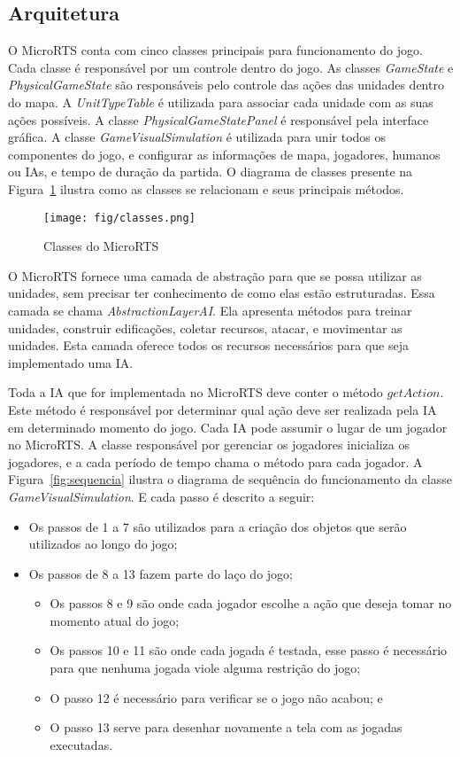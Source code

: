 \subsection{Arquitetura}

O MicroRTS conta com cinco classes principais para funcionamento do jogo. 
Cada classe é responsável por um controle dentro do jogo.
As classes \textit{GameState} e \textit{PhysicalGameState} são responsáveis pelo controle das ações das unidades dentro do mapa.
A \textit{UnitTypeTable} é utilizada para associar cada unidade com as suas ações possíveis.
A classe \textit{PhysicalGameStatePanel} é responsável pela interface gráfica.
A classe \textit{GameVisualSimulation} é utilizada para unir todos os componentes do jogo, e configurar as informações de mapa, jogadores, humanos ou IAs, e tempo de duração da partida.
O diagrama de classes presente na Figura~\ref{fig:classes} ilustra como as classes se relacionam e seus principais métodos.

\begin{figure}[ht]
	\centering
	\texttt{[image: fig/classes.png]}
	\caption{Classes do MicroRTS}
	\label{fig:classes}
\end{figure} 

O MicroRTS fornece uma camada de abstração para que se possa utilizar as unidades, sem precisar ter conhecimento de como elas estão estruturadas. 
Essa camada se chama \textit{AbstractionLayerAI}. 
Ela apresenta métodos para treinar unidades, construir edificações, coletar recursos, atacar, e movimentar as unidades. 
Esta camada oferece todos os recursos necessários para que seja implementado uma IA.

Toda a IA que for implementada no MicroRTS deve conter o método $getAction$.
Este método é responsável por determinar qual ação deve ser realizada pela IA em determinado momento do jogo.
Cada IA pode assumir o lugar de um jogador no MicroRTS. 
A classe responsável por gerenciar os jogadores inicializa os jogadores, e a cada período de tempo chama o método para cada jogador.
A Figura~\ref{fig:sequencia} ilustra o diagrama de sequência do funcionamento da classe \textit{GameVisualSimulation}. E cada passo é descrito a seguir:

\begin{itemize}
	\item Os passos de 1 a 7 são utilizados para a criação dos objetos que serão utilizados ao longo do jogo;
	\item Os passos de 8 a 13 fazem parte do laço do jogo;
	\begin{itemize}
		\item Os passos 8 e 9 são onde cada jogador escolhe a ação que deseja tomar no momento atual do jogo;
		\item Os passos 10 e 11 são onde cada jogada é testada, esse passo é necessário para que nenhuma jogada viole alguma restrição do jogo; 
		\item O passo 12 é necessário para verificar se o jogo não acabou; e
		\item O passo 13 serve para desenhar novamente a tela com as jogadas executadas.
	\end{itemize}
\end{itemize}

